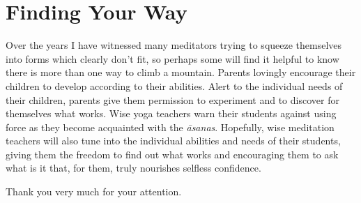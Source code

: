 \section{Finding Your Way}

Over the years I have witnessed many meditators trying to squeeze
themselves into forms which clearly don’t fit, so perhaps some will find
it helpful to know there is more than one way to climb a mountain.
Parents lovingly encourage their children to develop according to their
abilities. Alert to the individual needs of their children, parents give
them permission to experiment and to discover for themselves what works.
Wise yoga teachers warn their students against using force as they
become acquainted with the \emph{āsanas}. Hopefully, wise meditation teachers
will also tune into the individual abilities and needs of their
students, giving them the freedom to find out what works and encouraging
them to ask what is it that, for them, truly nourishes selfless confidence.

Thank you very much for your attention.
